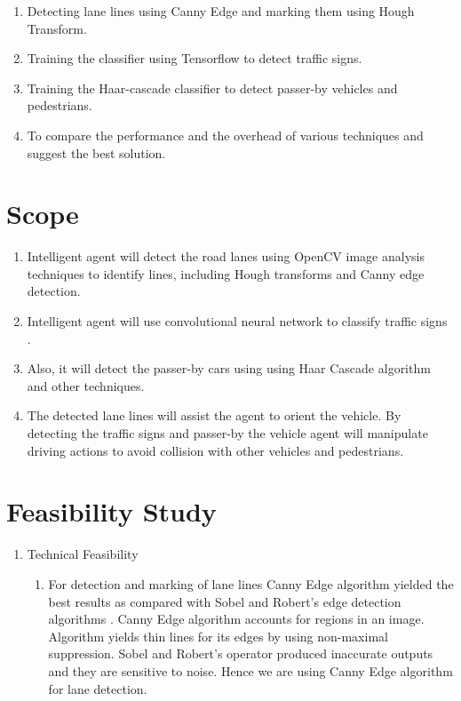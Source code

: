 \documentclass[12pt,a4paper,final]{article}
\begin{document}
\begin{flushleft}
\begin{enumerate}
\item
Detecting lane lines using Canny Edge and marking them using Hough Transform.

\item
Training the classifier using Tensorflow to detect traffic  signs.

\item
Training the Haar-cascade classifier to detect passer-by vehicles and pedestrians.

\item
To compare the performance and the overhead of various techniques and suggest the best solution.
\end{enumerate}

\noindent
\section{Scope}
\begin{enumerate}
\item
Intelligent agent will detect the road lanes using OpenCV image analysis techniques to identify lines, including Hough transforms and Canny edge detection.
\item
Intelligent agent will use convolutional neural network to classify traffic signs .
\item
Also, it will detect the passer-by cars using using Haar Cascade algorithm and other techniques.
\item
The detected lane lines will assist the agent to orient the vehicle. By detecting the traffic signs and passer-by the vehicle agent will manipulate driving actions to avoid collision with other vehicles and pedestrians.
\end{enumerate}

\noindent
\section{Feasibility Study}
\begin{enumerate}
\item Technical Feasibility \\
\begin{enumerate}

\item 
For detection and marking of lane lines Canny Edge algorithm yielded the best results as compared with Sobel and Robert's edge detection algorithms . Canny Edge algorithm accounts for regions in an image. Algorithm yields thin lines for its edges by using non-maximal suppression. Sobel and Robert's operator produced inaccurate outputs and they are sensitive to noise. Hence we are using Canny Edge algorithm for lane detection.



\end{enumerate}
\end{enumerate}
\end{flushleft}
\end{document}

